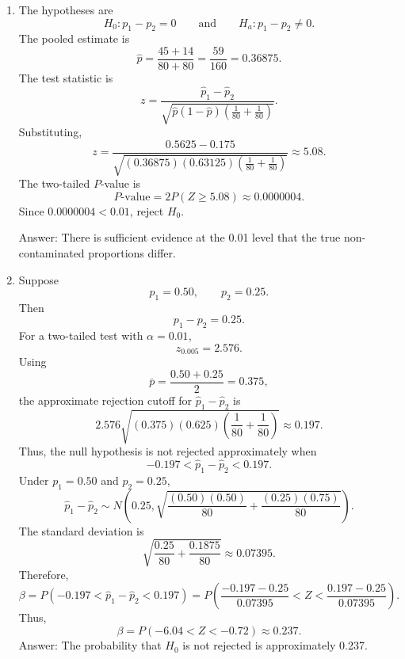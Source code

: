 \documentclass[11pt]{article}
\begin{document}
\begin{enumerate}
\item[(a)] The hypotheses are
\[
H_0:p_1-p_2=0
\qquad \text{and} \qquad
H_a:p_1-p_2\neq 0.
\]
The pooled estimate is
\[
\hat{p}=\frac{45+14}{80+80}=\frac{59}{160}=0.36875.
\]
The test statistic is
\[
z=\frac{\hat{p}_1-\hat{p}_2}{\sqrt{\hat{p}(1-\hat{p})\left(\frac{1}{80}+\frac{1}{80}\right)}}.
\]
Substituting,
\[
z=\frac{0.5625-0.175}{\sqrt{(0.36875)(0.63125)\left(\frac{1}{80}+\frac{1}{80}\right)}}
\approx 5.08.
\]
The two-tailed $P$-value is
\[
P\text{-value}=2P(Z\ge 5.08)\approx 0.0000004.
\]
Since $0.0000004<0.01$, reject $H_0$.

Answer: There is sufficient evidence at the 0.01 level that the true non-contaminated proportions differ.

\item[(b)] Suppose
\[
p_1=0.50,
\qquad p_2=0.25.
\]
Then
\[
p_1-p_2=0.25.
\]
For a two-tailed test with $\alpha=0.01$,
\[
z_{0.005}=2.576.
\]
Using
\[
\bar{p}=\frac{0.50+0.25}{2}=0.375,
\]
the approximate rejection cutoff for $\hat{p}_1-\hat{p}_2$ is
\[
2.576\sqrt{(0.375)(0.625)\left(\frac{1}{80}+\frac{1}{80}\right)}
\approx 0.197.
\]
Thus, the null hypothesis is not rejected approximately when
\[
-0.197<\hat{p}_1-\hat{p}_2<0.197.
\]
Under $p_1=0.50$ and $p_2=0.25$,
\[
\hat{p}_1-\hat{p}_2
\sim
N\left(0.25,
\sqrt{\frac{(0.50)(0.50)}{80}+\frac{(0.25)(0.75)}{80}}
\right).
\]
The standard deviation is
\[
\sqrt{\frac{0.25}{80}+\frac{0.1875}{80}}
\approx 0.07395.
\]
Therefore,
\[
\beta=P(-0.197<\hat{p}_1-\hat{p}_2<0.197)
=P\left(\frac{-0.197-0.25}{0.07395}<Z<\frac{0.197-0.25}{0.07395}\right).
\]
Thus,
\[
\beta=P(-6.04<Z<-0.72)\approx 0.237.
\]
Answer: The probability that $H_0$ is not rejected is approximately 0.237.
\end{enumerate}
\end{document}
